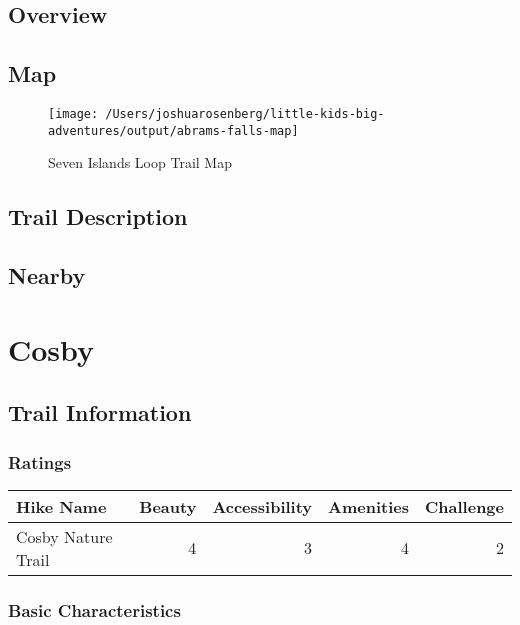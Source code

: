 \documentclass[
]{book}
\begin{document}
\hypertarget{overview-15}{%
\section{Overview}\label{overview-15}}

\hypertarget{map-15}{%
\section{Map}\label{map-15}}

\begin{figure}
\texttt{[image: /Users/joshuarosenberg/little-kids-big-adventures/output/abrams-falls-map]} \caption{Seven Islands Loop Trail Map}\label{fig:unnamed-chunk-53}
\end{figure}

\hypertarget{trail-description-16}{%
\section{Trail Description}\label{trail-description-16}}

\hypertarget{nearby-16}{%
\section{Nearby}\label{nearby-16}}

\hypertarget{cosby}{%
\chapter{Cosby}\label{cosby}}

\hypertarget{trail-information-16}{%
\section{Trail Information}\label{trail-information-16}}

\hypertarget{ratings-12}{%
\subsection{Ratings}\label{ratings-12}}

\begin{tabular}{l|r|r|r|r}
\hline
Hike Name & Beauty & Accessibility & Amenities & Challenge\\
\hline
Cosby Nature Trail & 4 & 3 & 4 & 2\\
\hline
\end{tabular}

\hypertarget{basic-characteristics-16}{%
\subsection{Basic Characteristics}\label{basic-characteristics-16}}
\end{document}

